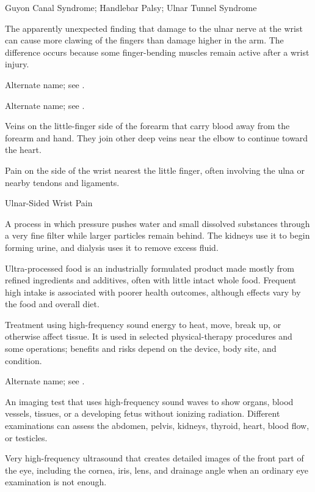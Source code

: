 \synonyms
Guyon Canal Syndrome; Handlebar Palsy; Ulnar Tunnel Syndrome

 The apparently unexpected finding that damage to the ulnar nerve at the wrist can cause more clawing of the fingers than damage higher in the arm. The difference occurs because some finger-bending muscles remain active after a wrist injury.

 Alternate name; see .

 Alternate name; see .

 Veins on the little-finger side of the forearm that carry blood away from the forearm and hand. They join other deep veins near the elbow to continue toward the heart.

 Pain on the side of the wrist nearest the little finger, often involving the ulna or nearby tendons and ligaments.

\synonyms
Ulnar-Sided Wrist Pain

 A process in which pressure pushes water and small dissolved substances through a very fine filter while larger particles remain behind. The kidneys use it to begin forming urine, and dialysis uses it to remove excess fluid.

 Ultra-processed food is an industrially formulated product made mostly from refined ingredients and additives, often with little intact whole food. Frequent high intake is associated with poorer health outcomes, although effects vary by the food and overall diet.

 Treatment using high-frequency sound energy to heat, move, break up, or otherwise affect tissue. It is used in selected physical-therapy procedures and some operations; benefits and risks depend on the device, body site, and condition.

 Alternate name; see .

 An imaging test that uses high-frequency sound waves to show organs, blood vessels, tissues, or a developing fetus without ionizing radiation. Different examinations can assess the abdomen, pelvis, kidneys, thyroid, heart, blood flow, or testicles.

 Very high-frequency ultrasound that creates detailed images of the front part of the eye, including the cornea, iris, lens, and drainage angle when an ordinary eye examination is not enough.

